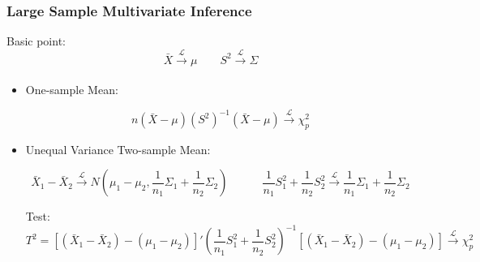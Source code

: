 \subsubsection{Large Sample Multivariate Inference}
    Basic point:
    \[
        \bar{X}\xrightarrow[]{\mathscr{L}} \mu\qquad S^2\xrightarrow[]{\mathscr{L}} \Sigma  
    \]
\begin{itemize}[topsep=2pt,itemsep=2pt]
    \item One-sample Mean:
    
    \[
        n(\bar{X}-\mu)(S^2)^{-1}(\bar{X}-\mu)\xrightarrow[]{\mathscr{L}} \chi^2_p 
    \]

    \item Unequal Variance Two-sample Mean:
    
    \[
        \bar{X}_1-\bar{X}_2\xrightarrow[]{\mathscr{L}} N(\mu_1-\mu _2,\dfrac{1}{n_1}\Sigma _1+\dfrac{1}{n_2}\Sigma _2) \qquad\quad \dfrac{1}{n_1}S_1^2+\dfrac{1}{n_2}S_2^2\xrightarrow[]{\mathscr{L}} \dfrac{1}{n_1}\Sigma _1+\dfrac{1}{n_2}\Sigma _2
    \]

    Test:
    \[
        T^2=\left[(\bar{X}_1-\bar{X}_2)-(\mu _1-\mu _2) \right]'(\dfrac{1}{n_1}S_1^2+\dfrac{1}{n_2}S_2^2)^{-1}\left[(\bar{X}_1-\bar{X}_2)-(\mu _1-\mu _2) \right]\xrightarrow[]{\mathscr{L}} \chi^2_p
    \]
    
    
    
    
\end{itemize}

    

    
    
    
    















